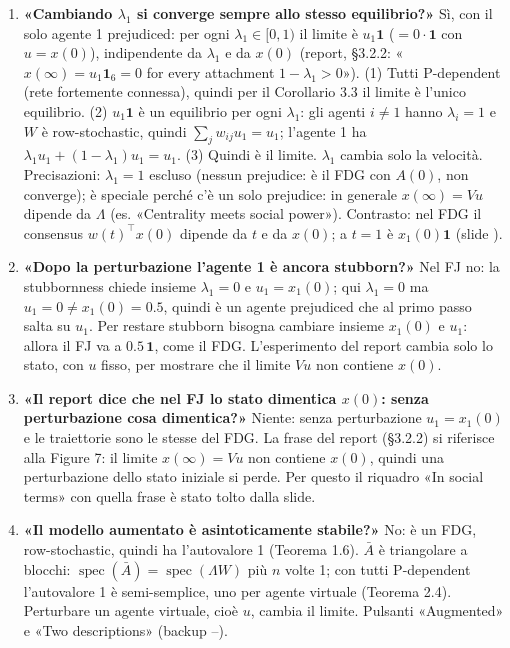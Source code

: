 \documentclass[a4paper,10pt]{article}
\newcommand{\fr}[1]{\getrefnumber{P-#1}}      %
\newcommand{\uno}{\mathbf{1}}
\begin{document}
\begin{enumerate}[leftmargin=1.6em,itemsep=3pt]
  \item \textbf{«Cambiando $\lambda_1$ si converge sempre allo stesso equilibrio?»} Sì, con il solo agente 1 prejudiced: per ogni $\lambda_1\in[0,1)$ il limite è $u_1\uno$ ($=0\cdot\uno$ con $u=x(0)$), indipendente da $\lambda_1$ e da $x(0)$ (report, §3.2.2: «$x(\infty)=u_1\mathbf 1_6=0$ for every attachment $1-\lambda_1>0$»). (1) Tutti P-dependent (rete fortemente connessa), quindi per il Corollario 3.3 il limite è l'unico equilibrio. (2) $u_1\uno$ è un equilibrio per ogni $\lambda_1$: gli agenti $i\neq1$ hanno $\lambda_i=1$ e $W$ è row-stochastic, quindi $\sum_j w_{ij}u_1=u_1$; l'agente 1 ha $\lambda_1u_1+(1-\lambda_1)u_1=u_1$. (3) Quindi è il limite. $\lambda_1$ cambia solo la velocità. Precisazioni: $\lambda_1=1$ escluso (nessun prejudice: è il FDG con $A(0)$, non converge); è speciale perché c'è un solo prejudice: in generale $x(\infty)=Vu$ dipende da $\Lambda$ (es. «Centrality meets social power»). Contrasto: nel FDG il consensus $w(t)^\top x(0)$ dipende da $t$ e da $x(0)$; a $t=1$ è $x_1(0)\uno$ (slide \fr{m-state-input}).
  \item \textbf{«Dopo la perturbazione l'agente 1 è ancora stubborn?»} Nel FJ no: la stubbornness chiede insieme $\lambda_1=0$ e $u_1=x_1(0)$; qui $\lambda_1=0$ ma $u_1=0\neq x_1(0)=0.5$, quindi è un agente prejudiced che al primo passo salta su $u_1$. Per restare stubborn bisogna cambiare insieme $x_1(0)$ e $u_1$: allora il FJ va a $0.5\,\uno$, come il FDG. L'esperimento del report cambia solo lo stato, con $u$ fisso, per mostrare che il limite $Vu$ non contiene $x(0)$.
  \item \textbf{«Il report dice che nel FJ lo stato dimentica $x(0)$: senza perturbazione cosa dimentica?»} Niente: senza perturbazione $u_1=x_1(0)$ e le traiettorie sono le stesse del FDG. La frase del report (§3.2.2) si riferisce alla Figure 7: il limite $x(\infty)=Vu$ non contiene $x(0)$, quindi una perturbazione dello stato iniziale si perde. Per questo il riquadro «In social terms» con quella frase è stato tolto dalla slide.
  \item \textbf{«Il modello aumentato è asintoticamente stabile?»} No: è un FDG, row-stochastic, quindi ha l'autovalore 1 (Teorema 1.6). $\bar A$ è triangolare a blocchi: $\operatorname{spec}(\bar A)=\operatorname{spec}(\Lambda W)$ più $n$ volte 1; con tutti P-dependent l'autovalore 1 è semi-semplice, uno per agente virtuale (Teorema 2.4). Perturbare un agente virtuale, cioè $u$, cambia il limite. Pulsanti «Augmented» e «Two descriptions» (backup \fr{bk-augmented}--\fr{bk-augmented2}).

\end{enumerate}
\end{document}
